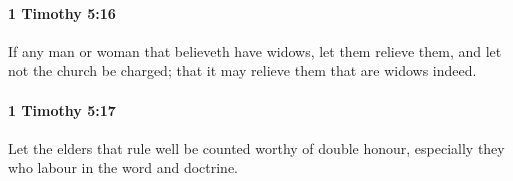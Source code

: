 		\paragraph{1 Timothy 5:16} %
			\label{1TIMOTHY-5-16}

			If any man or woman that believeth have widows, let them relieve them, and let not the church be charged; that it may relieve them that are widows indeed.

			\begin{framed}
			\scriptsize
				\begin{compactdesc}
					\item[SBLG] 
				\end{compactdesc}
			\end{framed}

		\paragraph{1 Timothy 5:17} %
			\label{1TIMOTHY-5-17}

			Let the elders that rule well be counted worthy of double honour, especially they who labour in the word and doctrine.

